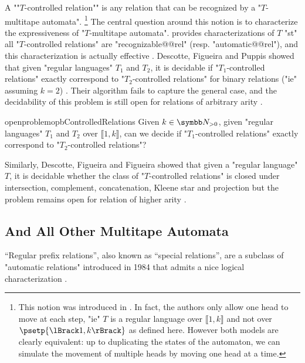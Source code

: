 A \AP""$T$-controlled relation"" is any relation that can be recognized by
a "$T$-multitape automata".%
\footnote{This notion was introduced in \cite[\S~3]{FigueiraLibkin2015SynchronizingRelations}.
In fact, the authors only allow one head to move at each step, "ie" $T$ is a regular language
over $\lBrack 1,k\rBrack$ and not over $\psetp{\lBrack 1,k\rBrack}$ as defined here. However both
models are clearly equivalent: up to duplicating the states of the automaton, we can simulate
the movement of multiple heads by moving one head at a time.}
The central question around this notion is to characterize the
expressiveness of "$T$-multitape automata".
\cite[Theorem~1]{FigueiraLibkin2015SynchronizingRelations} provides characterizations 
of $T$ "st" all "$T$-controlled relations" are "recognizable@@rel" (resp. "automatic@@rel"),
and this characterization is actually effective
\cite[Corollary~3]{FigueiraLibkin2015SynchronizingRelations}.
Descotte, Figueira and Puppis showed
that given "regular languages" $T_1$ and $T_2$, it is decidable
if "$T_1$-controlled relations" exactly correspond to "$T_2$-controlled relations"
for binary relations ("ie" assuming $k=2$)
\cite[Main Theorem]{DescotteFigueiraPuppis2018ResynchronizingClasses}.
Their algorithm fails to capture the general case, and the decidability of this problem
is still open for relations of arbitrary arity
\cite[\S~9]{DescotteFigueiraPuppis2018ResynchronizingClasses}.
\begin{restatable}{openproblem}{opbControlledRelations}
	\label{opb:controlled-relations}
	Given $k\in\Np$, given "regular languages" $T_1$ and $T_2$ over $\lBrack 1,k\rBrack$,
	can we decide if "$T_1$-controlled relations" exactly correspond to
	"$T_2$-controlled relations"?
\end{restatable}
Similarly, Descotte, Figueira and Figueira showed that given a "regular language"
$T$, it is decidable whether the class of "$T$-controlled relations"
is closed under intersection, complement, concatenation, Kleene star 
and projection
\cite[Theorem, p.~2]{DescotteFigueiraFigueira2019ClosurePropertiesSynchronizedRelations}
but the problem remains open for relation of higher arity
\cite[\S~6]{DescotteFigueiraFigueira2019ClosurePropertiesSynchronizedRelations}.


\subsection{And All Other Multitape Automata}

``Regular prefix relations'', also known as ``special relations'', are a subclass of "automatic relations" introduced in 1984 that admits a nice logical characterization
\cite[\S~``1984'']{Choffrut2006Survey}.

